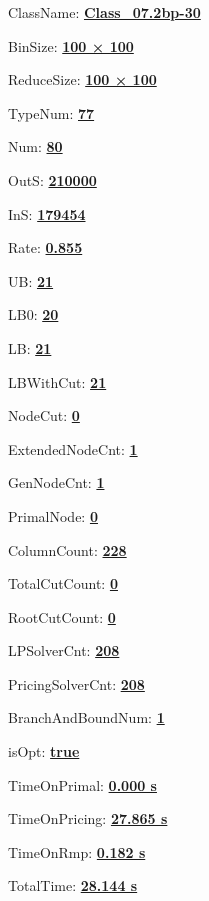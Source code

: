 \documentclass[11pt]{article}
\begin{document}
\pagestyle{empty}


ClassName: \underline{\textbf{Class_07.2bp-30}}
\par
BinSize: \underline{\textbf{100 × 100}}
\par
ReduceSize: \underline{\textbf{100 × 100}}
\par
TypeNum: \underline{\textbf{77}}
\par
Num: \underline{\textbf{80}}
\par
OutS: \underline{\textbf{210000}}
\par
InS: \underline{\textbf{179454}}
\par
Rate: \underline{\textbf{0.855}}
\par
UB: \underline{\textbf{21}}
\par
LB0: \underline{\textbf{20}}
\par
LB: \underline{\textbf{21}}
\par
LBWithCut: \underline{\textbf{21}}
\par
NodeCut: \underline{\textbf{0}}
\par
ExtendedNodeCnt: \underline{\textbf{1}}
\par
GenNodeCnt: \underline{\textbf{1}}
\par
PrimalNode: \underline{\textbf{0}}
\par
ColumnCount: \underline{\textbf{228}}
\par
TotalCutCount: \underline{\textbf{0}}
\par
RootCutCount: \underline{\textbf{0}}
\par
LPSolverCnt: \underline{\textbf{208}}
\par
PricingSolverCnt: \underline{\textbf{208}}
\par
BranchAndBoundNum: \underline{\textbf{1}}
\par
isOpt: \underline{\textbf{true}}
\par
TimeOnPrimal: \underline{\textbf{0.000 s}}
\par
TimeOnPricing: \underline{\textbf{27.865 s}}
\par
TimeOnRmp: \underline{\textbf{0.182 s}}
\par
TotalTime: \underline{\textbf{28.144 s}}
\par
\newpage


\end{document}
